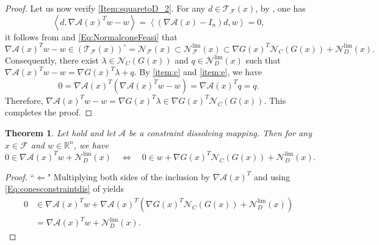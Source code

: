 \documentclass[11pt,a4paper,reqno]{amsart}
\newtheorem{theorem}{Theorem}[section]
\begin{document}
{\begin{proof}
Let us now verify \ref{Item:squaretoD_2}. For any $d\in \mathcal T_{\mathcal F}(x)$, by , one has   
\begin{equation*}
    \left< d, \nabla \mathcal A(x)^Tw-w \right>= \left< \left(\nabla \mathcal A(x)-I_n\right)d, w \right>=0,
\end{equation*}
it follows from \cite[Theorem~6.28~(a)]{rockafellar1998variational} and \eqref{Eq:NormalconeFeasi} that
\begin{equation*}
    \nabla \mathcal A(x)^Tw-w \in \left(\mathcal T_{\mathcal F}(x) \right)^{\circ} = \mathcal N_{\mathcal F}(x) \subset \mathcal N_{\mathcal F}^{\text{lim}}(x) \subset \nabla G(x)^T \mathcal N_C (G(x))+ \mathcal N_{D}^{\text{lim}}(x).
\end{equation*}
Consequently, there exist $\lambda \in \mathcal N_C (G(x))$ and $q\in \mathcal N_{D}^{\text{lim}}(x)$ such that
  $ \nabla \mathcal A(x)^Tw-w = \nabla G(x)^T \lambda +q $.
By  \ref{item:c} and \ref{item:e}, we have
\begin{equation*}
    0=\nabla \mathcal A(x)^T \left( \nabla \mathcal A(x)^T w-w\right)=\nabla \mathcal A(x)^T q =q.
\end{equation*}
Therefore, 
   $ \nabla \mathcal A(x)^Tw-w = \nabla G(x)^T \lambda \in \nabla G(x)^T \mathcal N_C (G(x))$.
This completes the proof.
\end{proof}
\begin{theorem}\label{Thm:2}
    Let  hold and let $\mathcal A$ be a constraint dissolving mapping.  Then for any $x\in \mathcal F$ and $w\in \mathbb R^n$, we have
    \[0\in \nabla \mathcal A(x)^Tw+\mathcal N_D^{\text{lim}}(x) \quad \Longleftrightarrow \quad 0\in w+\nabla G(x)^T\mathcal N_C(G(x))+\mathcal N_D^{\text{lim}}(x).
    \]
\end{theorem}
\begin{proof}
    ``$\Longleftarrow$" 
Multiplying both sides of the inclusion %
by $\nabla \mathcal{A}(x)^T$ and using \eqref{Eq:conesconstraintdis} of  yields
    \begin{equation*}
    \begin{aligned}
        0&\in \nabla \mathcal A(x)^Tw+\nabla \mathcal A(x)^T\left(\nabla G(x)^T\mathcal N_C(G(x))+\mathcal N_D^{\text{lim}}(x)\right)\\
        &=\nabla \mathcal A(x)^Tw+\mathcal N_D^{\text{lim}}(x).
        \end{aligned}
    \end{equation*}
    

\end{proof}}
\end{document}
